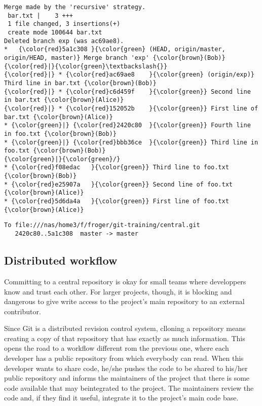 \documentclass{article}
\begin{document}
    \begin{Verbatim}[commandchars=\\\{\}]
Merge made by the 'recursive' strategy.
 bar.txt |    3 +++
 1 file changed, 3 insertions(+)
 create mode 100644 bar.txt
Deleted branch exp (was ac69ae8).
*   {\color{red}5a1c308	}{\color{green} (HEAD, origin/master, origin/HEAD, master)} Merge branch 'exp' {\color{brown}(Bob)}
{\color{red}|}{\color{green}\textbackslash{}}  
{\color{red}|} * {\color{red}ac69ae8	}{\color{green} (origin/exp)} Third line in bar.txt {\color{brown}(Bob)}
{\color{red}|} * {\color{red}c6d459f	}{\color{green}} Second line in bar.txt {\color{brown}(Alice)}
{\color{red}|} * {\color{red}152052b	}{\color{green}} First line of bar.txt {\color{brown}(Alice)}
* {\color{green}|} {\color{red}2420c80	}{\color{green}} Fourth line in foo.txt {\color{brown}(Bob)}
* {\color{green}|} {\color{red}bbb36ce	}{\color{green}} Third line in foo.txt {\color{brown}(Bob)}
{\color{green}|}{\color{green}/}  
* {\color{red}f08edac	}{\color{green}} Third line to foo.txt {\color{brown}(Bob)}
* {\color{red}e25907a	}{\color{green}} Second line of foo.txt {\color{brown}(Alice)}
* {\color{red}5d6da4a	}{\color{green}} First line of foo.txt {\color{brown}(Alice)}
    \end{Verbatim}

    \begin{Verbatim}[commandchars=\\\{\}]
To file:///nas/home3/f/froger/git-training/central.git
   2420c80..5a1c308  master -> master
    \end{Verbatim}


    \subsection{Distributed workflow}


    Committing to a central repository is okay for small teams where
developpers know and trust each other. For larger projects, though, it
is blocking and dangerous to give write access to the project's main
repository to an external contributor.

Since Git is a distributed revision control system, clloning a
repository means creating a copy of that repository that has exactly as
much information. This opens the road to a workflow different rom the
previous one, where each developer has a public repository from which
everybody can read. When this developer wants to share code, he/she
pushes the code to be shared to his/her public repository and informs
the maintainers of the project that there is some code available that
may beintegrated to the project. The maintainers review the code and, if
they find it useful, integrate it to the project's main code base.
\end{document}
